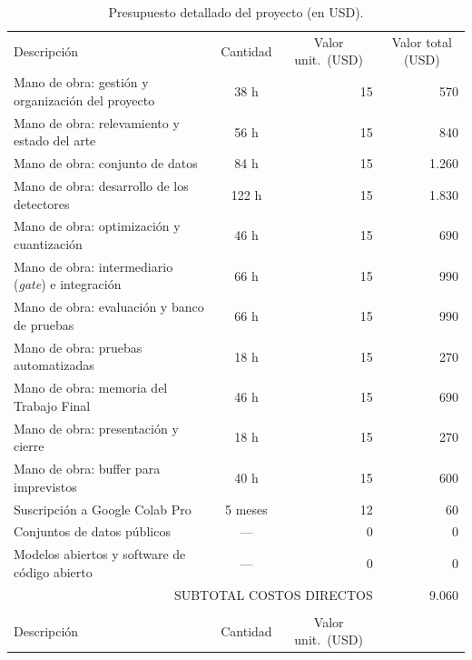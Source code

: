 \documentclass[
11pt, %
]{charter}
\begin{document}
\begin{table}[htpb]
\centering
\caption{Presupuesto detallado del proyecto (en USD).}
\label{tab:presupuesto}
\begin{tabularx}{\linewidth}{@{}|X|c|r|r|@{}}
\hline
\rowcolor[HTML]{C0C0C0}
\multicolumn{4}{|c|}{\cellcolor[HTML]{C0C0C0}COSTOS DIRECTOS} \\ \hline
\rowcolor[HTML]{C0C0C0}
Descripción &
  \multicolumn{1}{c|}{\cellcolor[HTML]{C0C0C0}Cantidad} &
  \multicolumn{1}{c|}{\cellcolor[HTML]{C0C0C0}Valor unit.\ (USD)} &
  \multicolumn{1}{c|}{\cellcolor[HTML]{C0C0C0}Valor total (USD)} \\ \hline
Mano de obra: gestión y organización del proyecto & 38 h & 15 & 570 \\ \hline
Mano de obra: relevamiento y estado del arte & 56 h & 15 & 840 \\ \hline
Mano de obra: conjunto de datos & 84 h & 15 & 1.260 \\ \hline
Mano de obra: desarrollo de los detectores & 122 h & 15 & 1.830 \\ \hline
Mano de obra: optimización y cuantización & 46 h & 15 & 690 \\ \hline
Mano de obra: intermediario (\textit{gate}) e integración & 66 h & 15 & 990 \\ \hline
Mano de obra: evaluación y banco de pruebas & 66 h & 15 & 990 \\ \hline
Mano de obra: pruebas automatizadas & 18 h & 15 & 270 \\ \hline
Mano de obra: memoria del Trabajo Final & 46 h & 15 & 690 \\ \hline
Mano de obra: presentación y cierre & 18 h & 15 & 270 \\ \hline
Mano de obra: buffer para imprevistos & 40 h & 15 & 600 \\ \hline
Suscripción a Google Colab Pro & 5 meses & 12 & 60 \\ \hline
Conjuntos de datos públicos & --- & 0 & 0 \\ \hline
Modelos abiertos y software de código abierto & --- & 0 & 0 \\ \hline
\multicolumn{3}{|r|}{SUBTOTAL COSTOS DIRECTOS} &
  \multicolumn{1}{r|}{9.060} \\ \hline
\rowcolor[HTML]{C0C0C0}
\multicolumn{4}{|c|}{\cellcolor[HTML]{C0C0C0}COSTOS INDIRECTOS} \\ \hline
\rowcolor[HTML]{C0C0C0}
Descripción &
  \multicolumn{1}{c|}{\cellcolor[HTML]{C0C0C0}Cantidad} &
  \multicolumn{1}{c|}{\cellcolor[HTML]{C0C0C0}Valor unit.\ (USD)} &

\end{tabularx}
\end{table}
\end{document}
